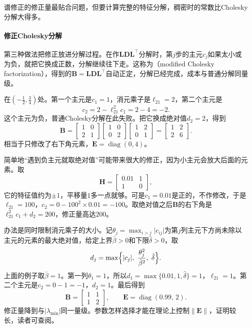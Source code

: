 谱修正的修正量最贴合问题，但要计算完整的特征分解，稠密时的常数比Cholesky分解大得多。

\paragraph{修正Cholesky分解}
第三种做法把修正放进分解过程。在作$\bm{L}\bm{D}\bm{L}^\top$分解时，第$j$步的主元$c_j$如果太小或为负，就把它换成正数，分解继续往下走。这称为（modified Cholesky factorization），得到的$\bm{B}=\bm{L}\bm{D}\bm{L}^\top$自动正定，分解已经完成，成本与普通分解同量级。

在$(-\tfrac12,\tfrac34)$处。第一个主元是$c_1=1$，消元乘子是$\ell_{21}=2$，第二个主元是
\[
 c_2=2-\ell_{21}^2c_1=2-4=-2.
\]
这个主元为负，普通Cholesky分解在此失败。把它换成绝对值$d_2=2$，得到
\[
 \bm{B}=\begin{bmatrix}1&0\\2&1\end{bmatrix}
 \begin{bmatrix}1&0\\0&2\end{bmatrix}
 \begin{bmatrix}1&2\\0&1\end{bmatrix}
 =\begin{bmatrix}1&2\\2&6\end{bmatrix}.
\]
相当于只修改了右下角元素，$\bm{E}=\operatorname{diag}(0,4)$。

简单地“遇到负主元就取绝对值”可能带来很大的修正，因为小主元会放大后面的元素。取
\[
 \bm{H}=\begin{bmatrix}0.01&1\\1&0\end{bmatrix},
\]
它的特征值约为$\pm1$，平移量$1$多一点就够。可是$c_1=0.01$是正的，不作修改，于是$\ell_{21}=100$，$c_2=0-100^2\times0.01=-100$。取绝对值之后$\bm{B}$的右下角是$\ell_{21}^2c_1+d_2=200$，修正量高达$200$。

办法是同时限制消元乘子的大小。记$\theta_j=\max_{i>j}\lvert c_{ij}\rvert$为第$j$列主元下方尚未除以主元的元素的最大绝对值，给定上界$\bar\beta>0$和下限$\hat\delta>0$，取
\begin{equation}
 d_j=\max\Bigl\{\lvert c_j\rvert,\ \frac{\theta_j^2}{\bar\beta^2},\ \hat\delta\Bigr\}.
 \label{eq:newton-modified-cholesky-pivot}
\end{equation}
上面的例子取$\bar\beta=1$。第一列$\theta_1=1$，所以$d_1=\max\{0.01,1,\hat\delta\}=1$，$\ell_{21}=1$。第二个主元是$c_2=0-1=-1$，$d_2=1$。最后得到
\[
 \bm{B}=\begin{bmatrix}1&1\\1&2\end{bmatrix},\qquad \bm{E}=\operatorname{diag}(0.99,\,2).
\]
修正量降到与$\lvert\lambda_{\min}\rvert$同一量级。参数怎样选择才能在理论上控制$\lVert\bm{E}\rVert$，证明较长，读者可查阅。

